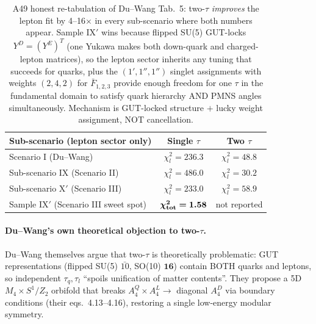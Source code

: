 \documentclass[a4paper,11pt]{article}
\theoremstyle{definition}
\theoremstyle{remark}
\begin{document}
\begin{table}[ht]
\centering
\begin{tabular}{lcc}
\toprule
Sub-scenario (lepton sector only) & Single $\tau$ &
Two $\tau$ \\
\midrule
Scenario I (Du--Wang) & $\chi^2_l = 236.3$ & $\chi^2_l = 48.8$ \\
Sub-scenario IX (Scenario II) & $\chi^2_l = 486.0$ &
$\chi^2_l = 30.2$ \\
Sub-scenario X$'$ (Scenario III) & $\chi^2_l = 233.0$ &
$\chi^2_l = 58.9$ \\
Sample IX$'$ (Scenario III sweet spot) &
$\bm{\chi^2_{\rm tot}=1.58}$ & not reported \\
\bottomrule
\end{tabular}
\caption{A49 honest re-tabulation of Du--Wang Tab.~5: two-$\tau$
\emph{improves} the lepton fit by 4--16$\times$ in every
sub-scenario where both numbers appear.  Sample IX$'$ wins
because flipped SU(5) GUT-locks $Y^D=(Y^E)^T$ (one Yukawa makes
both down-quark and charged-lepton matrices), so the lepton
sector inherits any tuning that succeeds for quarks, plus the
$(1',1'',1'')$ singlet assignments with weights $(2,4,2)$ for
$\bar F_{1,2,3}$ provide enough freedom for one $\tau$ in the
fundamental domain to satisfy quark hierarchy AND PMNS angles
simultaneously.  Mechanism is GUT-locked structure $+$ lucky
weight assignment, NOT cancellation.}
\label{tab:A49}
\end{table}

\paragraph{Du--Wang's own theoretical objection to two-$\tau$.}
Du--Wang \cite[\S 4, conclusions]{DuWang22} themselves argue
that two-$\tau$ is theoretically problematic: GUT
representations (flipped SU(5) $\bar{10}$, SO(10) $\mathbf{16}$)
contain BOTH quarks and leptons, so independent $\tau_q,\tau_l$
``spoils unification of matter contents''.  They propose a 5D
$M_4\times S^1/Z_2$ orbifold that breaks
$A_4^{Q}\times A_4^{L}\to$ diagonal $A_4^{D}$ via boundary
conditions (their eqs.~4.13--4.16), restoring a single
low-energy modular symmetry.
\end{document}

